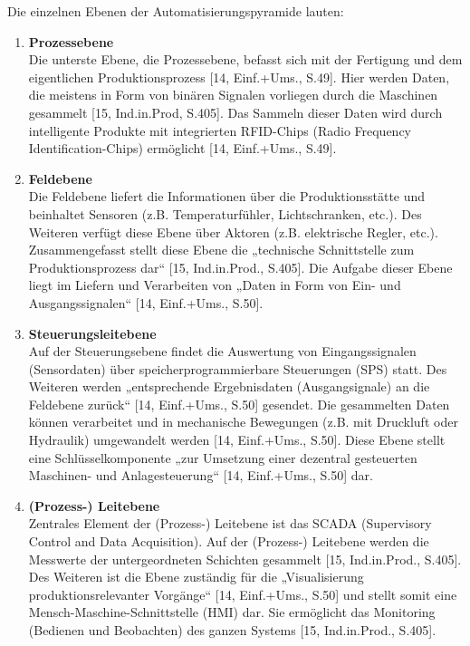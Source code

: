 \newline\newline
\noindent Die einzelnen Ebenen der Automatisierungspyramide lauten:
\begin{enumerate}
	\item \textbf{Prozessebene}\\
	Die unterste Ebene, die Prozessebene, befasst sich mit der Fertigung und dem eigentlichen Produktionsprozess [14, Einf.+Ums., S.49]. Hier werden Daten, die meistens in Form von binären Signalen vorliegen durch die Maschinen gesammelt [15, Ind.in.Prod, S.405]. Das Sammeln dieser Daten wird durch intelligente Produkte mit integrierten RFID-Chips (Radio Frequency Identification-Chips) ermöglicht [14, Einf.+Ums., S.49].
	\item \textbf{Feldebene}\\
	Die Feldebene liefert die Informationen über die Produktionsstätte und beinhaltet Sensoren (z.B. Temperaturfühler, Lichtschranken, etc.). Des Weiteren verfügt diese Ebene über Aktoren (z.B. elektrische Regler, etc.). Zusammengefasst stellt diese Ebene die „technische Schnittstelle zum Produktionsprozess dar“ [15, Ind.in.Prod., S.405]. Die Aufgabe dieser Ebene liegt im Liefern und Verarbeiten von „Daten in Form von Ein- und Ausgangssignalen“ [14, Einf.+Ums., S.50].
	\item \textbf{Steuerungsleitebene}\\
	Auf der Steuerungsebene findet die Auswertung von Eingangssignalen (Sensordaten) über speicherprogrammierbare Steuerungen (SPS) statt. Des Weiteren werden „entsprechende Ergebnisdaten (Ausgangsignale) an die Feldebene zurück“ [14, Einf.+Ums., S.50] gesendet. Die gesammelten Daten können verarbeitet und in mechanische Bewegungen (z.B. mit Druckluft oder Hydraulik) umgewandelt werden [14, Einf.+Ums., S.50]. Diese Ebene stellt eine Schlüsselkomponente „zur Umsetzung einer dezentral gesteuerten Maschinen- und Anlagesteuerung“ [14, Einf.+Ums., S.50] dar.
	\item \textbf{(Prozess-) Leitebene}\\
	Zentrales Element der (Prozess-) Leitebene ist das SCADA (Supervisory Control and Data Acquisition). Auf der (Prozess-) Leitebene werden die Messwerte der untergeordneten Schichten gesammelt [15, Ind.in.Prod., S.405]. Des Weiteren ist die Ebene zuständig für die „Visualisierung produktionsrelevanter Vorgänge“ [14, Einf.+Ums., S.50] und stellt somit eine Mensch-Maschine-Schnittstelle (HMI) dar. Sie ermöglicht das Monitoring (Bedienen und Beobachten) des ganzen Systems [15, Ind.in.Prod., S.405].

\end{enumerate}

